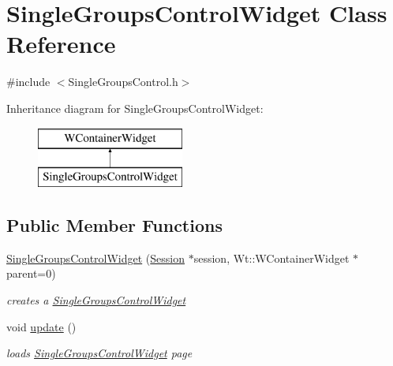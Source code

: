 \hypertarget{class_single_groups_control_widget}{}\section{Single\+Groups\+Control\+Widget Class Reference}
\label{class_single_groups_control_widget}


{\ttfamily \#include $<$Single\+Groups\+Control.\+h$>$}

Inheritance diagram for Single\+Groups\+Control\+Widget\+:\begin{figure}[H]
\begin{center}
\leavevmode
\includegraphics[height=2.000000cm]{class_single_groups_control_widget}
\end{center}
\end{figure}
\subsection*{Public Member Functions}
\begin{DoxyCompactItemize}
\item 
\hyperlink{class_single_groups_control_widget_a49e2f9e4c74289cf0d3167283e14fded}{Single\+Groups\+Control\+Widget} (\hyperlink{class_session}{Session} $\ast$session, Wt\+::\+W\+Container\+Widget $\ast$parent=0)
\begin{DoxyCompactList}\small\item\em creates a \hyperlink{class_single_groups_control_widget}{Single\+Groups\+Control\+Widget} \end{DoxyCompactList}\item 
void \hyperlink{class_single_groups_control_widget_ab6eea77943da3ae94d43764d2a5a4aed}{update} ()
\begin{DoxyCompactList}\small\item\em loads \hyperlink{class_single_groups_control_widget}{Single\+Groups\+Control\+Widget} page \end{DoxyCompactList}\end{DoxyCompactItemize}

